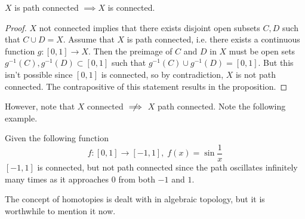     \begin{proposition}
      $X$ is path connected $\implies X$ is connected. 
      \begin{figure}[H]
        \centering 
        \caption{}  
        \label{fig:path_vs_reg_connectedness}
      \end{figure}
    \end{proposition}
    \begin{proof}
      $X$ not connected implies that there exists disjoint open subsets $C, D$ such that $C \cup D = X$. Assume that $X$ is path connected, i.e. there exists a continuous function $g: [0,1] \longrightarrow X$. Then the preimage of $C$ and $D$ in $X$ must be open sets $g^{-1} (C), g^{-1} (D) \subset [0,1]$ such that $g^{-1}(C) \cup g^{-1}(D) = [0,1]$. But this isn't possible since $[0,1]$ is connected, so by contradiction, $X$ is not path connected. The contrapositive of this statement results in the proposition. 
    \end{proof}

    However, note that $X$ connected $\centernot\implies$ $X$ path connected. Note the following example. 

    \begin{example}
      Given the following function 
      \begin{equation}
        f:[0,1] \longrightarrow [-1,1], \; f(x) = \sin{\frac{1}{x}}
      \end{equation}
      $[-1,1]$ is connected, but not path connected since the path oscillates infinitely many times as it approaches $0$ from both $-1$ and $1$. 
    \end{example}

    The concept of homotopies is dealt with in algebraic topology, but it is worthwhile to mention it now. 

